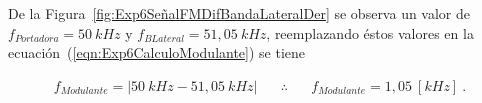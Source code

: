       De la Figura~\ref{fig:Exp6SeñalFMDifBandaLateralDer} se observa un valor de 
      $f_{Portadora}=50~kHz$ y $f_{BLateral}=51,05~kHz$, reemplazando éstos valores en 
      la ecuación~(\ref{eqn:Exp6CalculoModulante}) se tiene 

      \begin{align*}
        f_{Modulante}=|50~kHz-51,05~kHz| \hspace{20pt} \therefore \hspace{20pt} \boxed{f_{Modulante}=1,05~[kHz]}~.
      \end{align*}
    
